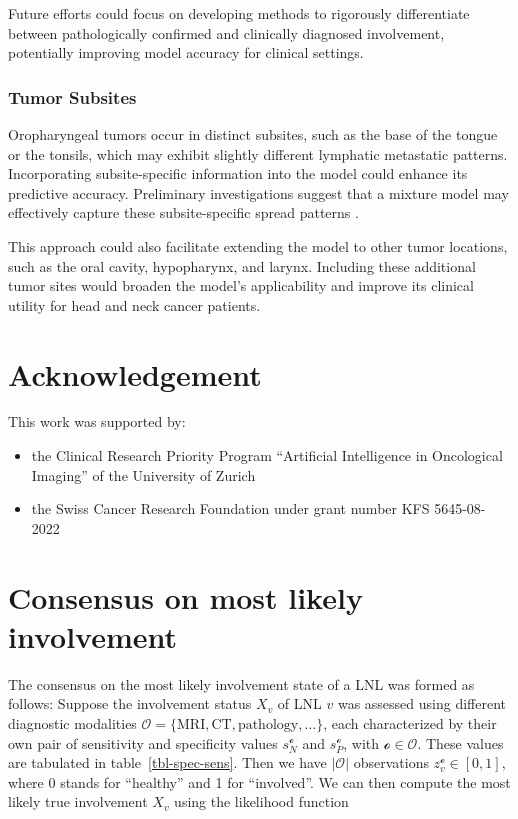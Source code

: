 \documentclass[
  sn-mathphys-num,
]{sn-jnl}
\providecommand{\tightlist}{%
  \setlength{\itemsep}{0pt}\setlength{\parskip}{0pt}}\usepackage{longtable,booktabs,array}
\begin{document}
Future efforts could focus on developing methods to rigorously
differentiate between pathologically confirmed and clinically diagnosed
involvement, potentially improving model accuracy for clinical settings.

\subsubsection{Tumor Subsites}\label{tumor-subsites}

Oropharyngeal tumors occur in distinct subsites, such as the base of the
tongue or the tonsils, which may exhibit slightly different lymphatic
metastatic patterns. Incorporating subsite-specific information into the
model could enhance its predictive accuracy. Preliminary investigations
suggest that a mixture model may effectively capture these
subsite-specific spread patterns
\citep{sarrut_proceedings_2024, ludwig_modelling_2023a}.

This approach could also facilitate extending the model to other tumor
locations, such as the oral cavity, hypopharynx, and larynx. Including
these additional tumor sites would broaden the model's applicability and
improve its clinical utility for head and neck cancer patients.

\section{Acknowledgement}\label{acknowledgement}

This work was supported by:

\begin{itemize}
\tightlist
\item
  the Clinical Research Priority Program ``Artificial Intelligence in
  Oncological Imaging'' of the University of Zurich
\item
  the Swiss Cancer Research Foundation under grant number KFS
  5645-08-2022
\end{itemize}

\section{Consensus on most likely involvement}\label{sec-consensus}

The consensus on the most likely involvement state of a LNL was formed
as follows: Suppose the involvement status \(X_v\) of LNL \(v\) was
assessed using different diagnostic modalities
\(\mathcal{O} = \{ \text{MRI}, \text{CT}, \text{pathology}, \ldots \}\),
each characterized by their own pair of sensitivity and specificity
values \(s_N^{\mathcal{o}}\) and \(s_P^{\mathcal{o}}\), with
\(\mathcal{o} \in \mathcal{O}\). These values are tabulated in
table~\ref{tbl-spec-sens}. Then we have \(|\mathcal{O}|\) observations
\(z_v^{\mathcal{o}} \in \left[ 0, 1 \right]\), where 0 stands for
``healthy'' and 1 for ``involved''. We can then compute the most likely
true involvement \(X_v\) using the likelihood function
\end{document}
